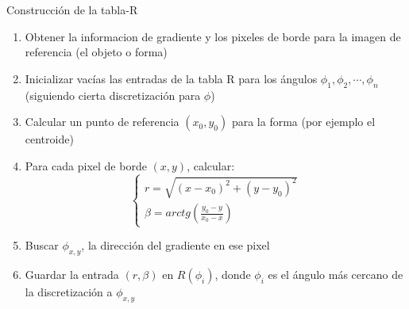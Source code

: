 \documentclass{beamer}
\begin{document}
\begin{frame}{Construcción de la tabla-R}
    \begin{enumerate}
        \item Obtener la informacion de gradiente y los pixeles de borde para la imagen de referencia (el objeto o forma)
       \item Inicializar vacías las entradas de la tabla R para los ángulos $\phi_1, \phi_2, \cdots, \phi_n$ (siguiendo cierta discretización para $\phi$)
        \item Calcular un punto de referencia $(x_0, y_0)$ para la forma (por ejemplo el centroide)
        \item Para cada pixel de borde $(x,y)$, calcular:
            \[ 
                \begin{cases}
                    r = \sqrt{(x - x_0)^2 + (y-y_0)^2} \\
                    \beta = arctg (\frac{y_0 - y}{x_0 - x})
                \end{cases}
            \]
        \item Buscar $\phi_{x,y}$, la dirección del gradiente en ese pixel
        \item Guardar la entrada $(r, \beta)$ en $R(\phi_i)$, donde $\phi_i$ es el ángulo más cercano de la discretización a $\phi_{x,y}$
        \end{enumerate}
\end{frame}
\end{document}
